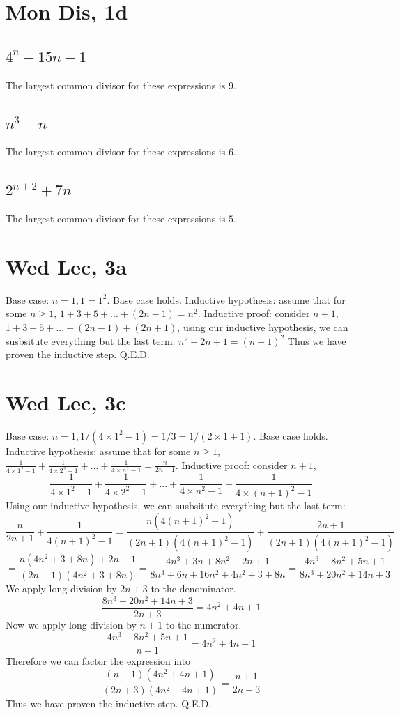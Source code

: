 \documentclass[12pt]{article}
\begin{document}
\section{Mon Dis, 1d}
\subsection{$4^n + 15n -1$}
The largest common divisor for these expressions is $9$.

\subsection{$n^3 - n$}
The largest common divisor for these expressions is $6$.

\subsection{$2^{n+2} + 7n$}
The largest common divisor for these expressions is $5$.
\newpage


\section{Wed Lec, 3a}
Base case: $n = 1, 1 = 1^2$. Base case holds.
\newline
Inductive hypothesis: assume that for some $n \geq 1$, $1+ 3 + 5 + ... + (2n-1) = n^2$.
\newline
Inductive proof: consider $n+1$, $1+ 3 + 5 + ... + (2n-1) + (2n+1)$, using our inductive hypothesis, we can susbsitute everything but the last term: $n^2 + 2n + 1 = (n+1)^2$
\newline
Thus we have proven the inductive step. Q.E.D.

\section{Wed Lec, 3c}
Base case: $n = 1, 1/(4 \times 1^2 - 1) = 1/3 = 1/(2 \times 1 + 1)$. Base case holds.
\newline
Inductive hypothesis: assume that for some $n \geq 1$, $\frac{1}{4 \times 1^2 - 1} + \frac{1}{4 \times 2^2 - 1} + ... + \frac{1}{4 \times n^2 - 1} = \frac{n}{2n+1}$.
\newline
Inductive proof: consider $n+1$, $$\frac{1}{4 \times 1^2 - 1} + \frac{1}{4 \times 2^2 - 1} + ... + \frac{1}{4 \times n^2 - 1} + \frac{1}{4 \times (n+1)^2 - 1}$$
Using our inductive hypothesis, we can susbsitute everything but the last term: $$\frac{n}{2n+1} + \frac{1}{4(n+1)^2 - 1} = \frac{n (4(n+1)^2-1)}{(2n+1)(4(n+1)^2-1)} + \frac{2n+1}{(2n+1)(4(n+1)^2 - 1)}$$
$$=\frac{n(4n^2+3+8n) + 2n +1}{(2n+1)(4n^2+3+8n)} = \frac{4n^3+3n+8n^2+2n+1}{8n^3+6n+16n^2+4n^2+3+8n}=\frac{4n^3+8n^2+5n+1}{8n^3+20n^2+14n+3}$$
We apply long division by $2n+3$ to the denominator.
$$\frac{8n^3+20n^2+14n+3}{2n+3} = 4n^2 + 4n + 1$$
Now we apply long division by $n+1$ to the numerator.
$$\frac{4n^3+8n^2+5n+1}{n+1} =  4n^2 + 4n + 1$$
Therefore we can factor the expression into
$$\frac{(n+1)(4n^2 + 4n + 1)}{(2n+3)(4n^2 + 4n + 1)} = \frac{n+1}{2n+3}$$
\newline
Thus we have proven the inductive step. Q.E.D.
\end{document}
